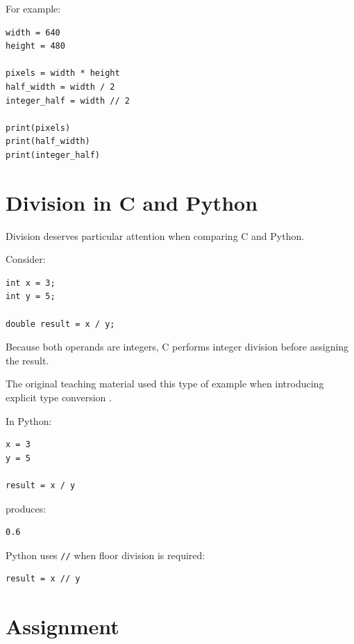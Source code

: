 For example:

\begin{listing}[htbp]
    \caption{Basic arithmetic in Python.}
    \label{lst:python-arithmetic}

\begin{verbatim}
width = 640
height = 480

pixels = width * height
half_width = width / 2
integer_half = width // 2

print(pixels)
print(half_width)
print(integer_half)
\end{verbatim}

\end{listing}


\section{Division in C and Python}
\label{sec:c-python-division}

Division deserves particular attention when comparing C and Python.

Consider:

\begin{verbatim}
int x = 3;
int y = 5;

double result = x / y;
\end{verbatim}

Because both operands are integers, C performs integer division before
assigning the result.

The original teaching material used this type of example when
introducing explicit type conversion
\cite{johnson_uqc146_c2}.

In Python:

\begin{verbatim}
x = 3
y = 5

result = x / y
\end{verbatim}

produces:

\begin{verbatim}
0.6
\end{verbatim}

Python uses \texttt{//} when floor division is required:

\begin{verbatim}
result = x // y
\end{verbatim}


\section{Assignment}
\label{sec:python-assignment}

